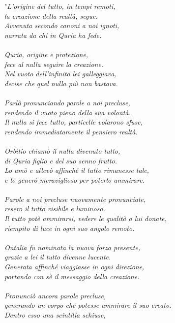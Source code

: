 \documentclass[10pt,twoside,onecolumn,openany]{book}
\begin{document}
\begin{quotebox}
\begin{multicols}{2}
"\textit{L'origine del tutto, in tempi remoti,\\
la creazione della realtà, segue.\\
Avvenuta secondo canoni a noi ignoti,\\
narrata da chi in Quria ha fede.\\
\\
Quria, origine e protezione,\\
fece al nulla seguire la creazione.\\
Nel vuoto dell'infinito lei galleggiava,\\
decise che quel nulla più non bastava.\\
\\
Parlò pronunciando parole a noi precluse,\\
rendendo il vuoto pieno della sua volontà.\\
Il nulla si fece tutto, particelle volarono sfuse,\\
rendendo immediatamente il pensiero realtà.\\
\\
Orbitio chiamò il nulla divenuto tutto,\\
di Quria figlio e del suo senno frutto.\\
Lo amò e allevò affinché il tutto rimanesse tale,\\
e lo generò meraviglioso per poterlo ammirare.\\
\\
Parole a noi precluse nuovamente pronunciate,\\
resero il tutto visibile e luminoso.\\
Il tutto potè ammirarsi, vedere le qualità a lui donate,\\
riempito di luce in ogni suo angolo remoto.\\
\\
Ontalia fu nominata la nuova forza presente,\\
grazie a lei il tutto divenne lucente.\\
Generata affinché viaggiasse in ogni direzione,\\
portando con sè il messaggio della creazione.\\
\\
Pronunciò ancora parole precluse,\\
generando un corpo che potesse ammirare il suo creato.\\
Dentro esso una scintilla schiuse,\\
}
\end{multicols}
\end{quotebox}
\end{document}
